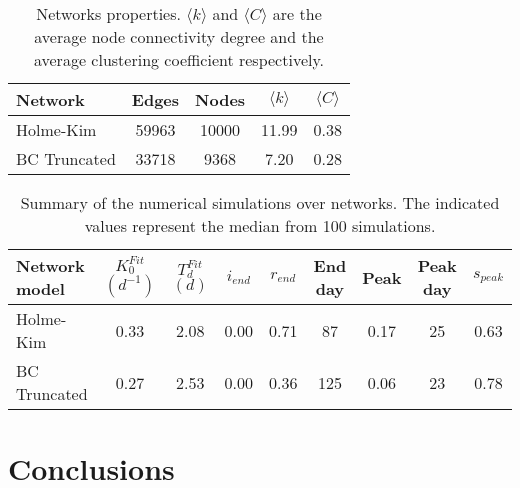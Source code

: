 \documentclass[DIV=12, BCOR=0pt]{scrartcl}  %
\begin{document}
	\begin{table}[h!]
		\centering
		\caption{Networks properties. $\langle k \rangle$ and $\langle C \rangle$ are the average node connectivity degree and the average clustering coefficient respectively. }
		\label{tab:lock_networks}
		\begin{tabular}{lcccc}
			\toprule
			Network &  Edges &  Nodes & $\langle k \rangle$ & $\langle C \rangle$ \\
			\midrule
			Holme-Kim 		&  59963 &  10000 & 11.99 &  0.38 \\
			BC Truncated 	&  33718 &   9368 &  7.20 &  0.28 \\
			
			\bottomrule
		\end{tabular}
	\end{table}

	\begin{table}[h!]
		\centering
		\caption{Summary of the numerical simulations over networks. The indicated values represent the median from 100 simulations.}
		\label{tab:lock_results}
		\begin{tabular}{lcccccccc}
			\toprule
			Network model & $K_0^{Fit}$ $(d^{-1})$ & $T_d^{Fit}$ $(d)$ & $i_{end}$ & $r_{end}$ & End day & Peak  & Peak day & $s_{peak}$\\
			\midrule
		 	Holme-Kim 		&    0.33 &   2.08 &  0.00 &  0.71 &  	 87 &  0.17 &   25 &	0.63\\
			BC Truncated	&    0.27 &   2.53 &  0.00 &  0.36 & 		125 &  0.06 &   23 &	0.78\\
			
			
			\bottomrule
		\end{tabular}
	\end{table}
	
	
	\section{Conclusions}
%
%		
  \footnotesize
	
\end{document}
